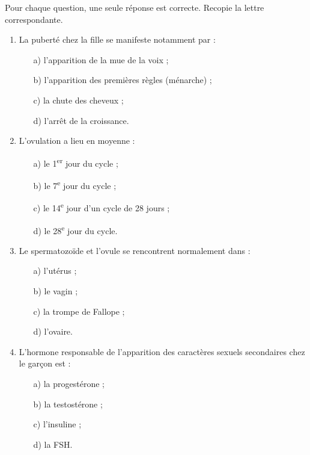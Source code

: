 \documentclass[11pt]{article}
\begin{document}
\begin{exercice}
Pour chaque question, une seule réponse est correcte. Recopie la lettre correspondante.
\begin{enumerate}
\item La puberté chez la fille se manifeste notamment par :
\begin{enumerate}
\item[a)] l'apparition de la mue de la voix ;
\item[b)] l'apparition des premières règles (ménarche) ;
\item[c)] la chute des cheveux ;
\item[d)] l'arrêt de la croissance.
\end{enumerate}
\item L'ovulation a lieu en moyenne :
\begin{enumerate}
\item[a)] le 1\textsuperscript{er} jour du cycle ;
\item[b)] le 7\textsuperscript{e} jour du cycle ;
\item[c)] le 14\textsuperscript{e} jour d'un cycle de 28 jours ;
\item[d)] le 28\textsuperscript{e} jour du cycle.
\end{enumerate}
\item Le spermatozoïde et l'ovule se rencontrent normalement dans :
\begin{enumerate}
\item[a)] l'utérus ; \item[b)] le vagin ; \item[c)] la trompe de Fallope ; \item[d)] l'ovaire.
\end{enumerate}
\item L'hormone responsable de l'apparition des caractères sexuels secondaires chez le garçon est :
\begin{enumerate}
\item[a)] la progestérone ; \item[b)] la testostérone ; \item[c)] l'insuline ; \item[d)] la FSH.
\end{enumerate}
\end{enumerate}
\end{exercice}
\end{document}
